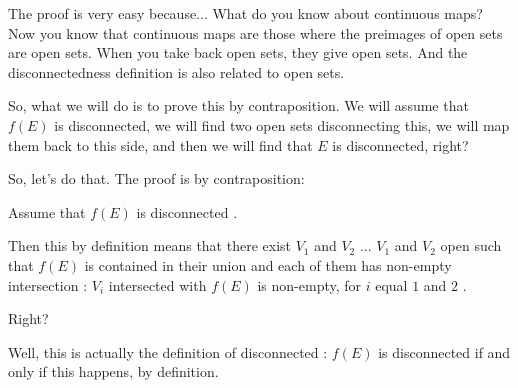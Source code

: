\begin{content}
\end{content}

\begin{proofWrapper}

\begin{speech}[00:22:35 - 00:24:35]
The proof is very easy because... What do you know about continuous maps? Now you know that continuous maps are those where the preimages of open sets are open sets. When you take back open sets, they give open sets. And the disconnectedness definition is also related to open sets.

So, what we will do is to prove this by contraposition. We will assume that $f(E)$ is disconnected, we will find two open sets disconnecting this, we will map them back to this side, and then we will find that $E$ is disconnected, right?

So, let's do that. The proof is by contraposition:

Assume that $f(E)$ is disconnected .

Then this by definition means that there exist $V_1$ and $V_2$ ... $V_1$ and $V_2$ open  such that $f(E)$ is contained in their union  and each of them has non-empty intersection : $V_i$ intersected with $f(E)$ is non-empty, for $i$ equal $1$ and $2$ .

Right?

Well, this is actually the definition of disconnected : $f(E)$ is disconnected if and only if this happens, by definition.
\end{speech}


\end{proofWrapper}
